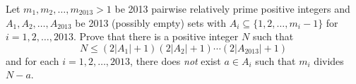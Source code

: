 Let $m_1,m_2,\ldots,m_{2013} > 1$ be 2013 pairwise relatively prime positive integers and $A_1,A_2,\ldots,A_{2013}$ be 2013 (possibly empty) sets with $A_i\subseteq \{1,2,\ldots,m_i-1\}$ for $i=1,2,\ldots,2013$.  Prove that there is a positive integer $N$ such that
\[ N \le \left( 2\left\lvert A_1 \right\rvert + 1 \right)\left( 2\left\lvert A_2 \right\rvert + 1 \right)\cdots\left( 2\left\lvert A_{2013} \right\rvert + 1 \right) \]
and for each $i = 1, 2, \ldots, 2013$, there does \emph{not} exist $a \in A_i$ such that $m_i$ divides $N-a$.